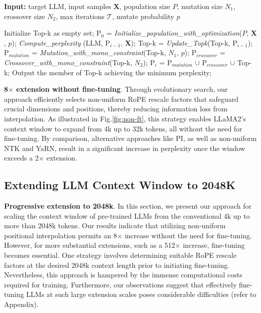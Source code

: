\begin{algorithm}[t]
	\small
	\caption{The search algorithm}
	\textbf{Input:} target LLM, input samples $\mathbf{X}$,   population size $P$, mutation size $N_1$, crossover size $N_2$, max iterations $\mathcal{T}$, mutate probability $p$\\

	\begin{algorithmic}[1]
		\label{alg:search}
		\STATE Initialize Top-k as empty set;	
		\STATE $\text{P}_0$ = \textit{Initialize\_population\_with\_optimization}($P$, $\mathbf{X}$, $p$); 
		\STATE \textit{Compute\_perplexity} (LLM, $\text{P}_{i-1}$, $\mathbf{X}$);
		\STATE Top-k = \textit{Update\_Topk}(Top-k, $\text{P}_{i-1}$);
		\STATE $\text{P}_{mutation}$ = \textit{Mutation\_with\_mono\_constraint}(Top-k, $N_1$, $p$); 
		\STATE $\text{P}_{crossover}$ = \textit{Crossover\_with\_mono\_constraint}(Top-k, $N_2$);
		\STATE $\text{P}_i$ = $\text{P}_{mutation}$ $\cup$ $\text{P}_{crossover}$ $\cup$ Top-k;
		\ENDFOR
		\STATE Output the member of Top-k achieving the minimum perplexity;
	\end{algorithmic}
\end{algorithm}

\textbf{8$\times$ extension without fine-tuning}. Through evolutionary search, our approach efficiently selects non-uniform RoPE rescale factors that safeguard crucial dimensions and positions, thereby reducing information loss from interpolation. As illustrated in Fig.\ref{fig:non-ft}, this strategy enables LLaMA2’s context window to expand from 4k up to 32k tokens, all without the need for fine-tuning. By comparison, alternative approaches like PI, as well as non-uniform NTK and YaRN, result in a significant increase in perplexity once the window exceeds a 2$\times$ extension.

\subsection{Extending LLM Context Window to 2048K}
\label{sec:extendto2048k}

\textbf{Progressive extension to 2048k}. In this section, we present our approach for scaling the context window of pre-trained LLMs from the conventional 4k up to more than 2048k tokens. Our results indicate that utilizing non-uniform positional interpolation permits an 8$\times$ increase without the need for fine-tuning. However, for more substantial extensions, such as a 512$\times$ increase, fine-tuning becomes essential. One strategy involves determining suitable RoPE rescale factors at the desired 2048k context length prior to initiating fine-tuning. Nevertheless, this approach is hampered by the immense computational costs required for training. Furthermore, our observations suggest that effectively fine-tuning LLMs at such large extension scales poses considerable difficulties (refer to Appendix).

